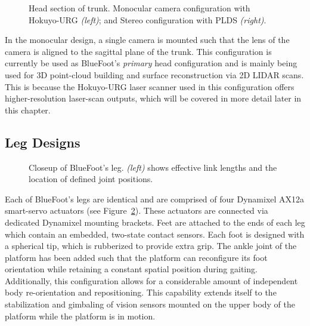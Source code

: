 				\begin{figure}[h!]
					\centering
					\caption{Head section of trunk. Monocular camera configuration with Hokuyo-URG \emph{(left)}; and Stereo configuration with PLDS \emph{(right)}. }
					\label{fig::head_module}
				\end{figure}		

				In the monocular design, a single camera is mounted such that the lens of the camera is aligned to the sagittal plane of the trunk. This configuration is currently be used as BlueFoot's \emph{primary} head configuration and is mainly being used for 3D point-cloud building and surface reconstruction via 2D LIDAR scans. This is because the Hokuyo-URG laser scanner used in this configuration offers higher-resolution laser-scan outputs, which will be covered in more detail later in this chapter.

		\subsection{Leg Designs}

			\begin{figure}[h!]
				\centering
				\caption{Closeup of BlueFoot's leg. \emph{(left)} shows effective link lengths and the location of defined joint positions.}
				\label{fig::leg_labeled}
			\end{figure}
				
			Each of BlueFoot's legs are identical and are comprised of four Dynamixel AX12a smart-servo actuators (see Figure~\ref{fig::leg_labeled}). These actuators are connected via dedicated Dynamixel mounting brackets. Feet are attached to the ends of each leg which contain an embedded, two-state contact sensors. Each foot is designed with a spherical tip, which is rubberized to provide extra grip. The ankle joint of the platform has been added such that the platform can reconfigure its foot orientation while retaining a constant spatial position during gaiting. Additionally, this configuration allows for a considerable amount of independent body re-orientation and repositioning. This capability extends itself to the stabilization and gimbaling of vision sensors mounted on the upper body of the platform while the platform is in motion.
		

